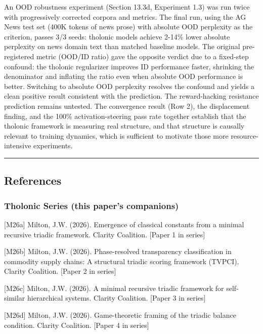 \documentclass[
  11pt,
  letterpaper,
]{article}
\begin{document}
An OOD robustness experiment (Section 13.3d, Experiment 1.3) was run
twice with progressively corrected corpora and metrics. The final run,
using the AG News test set (400K tokens of news prose) with absolute OOD
perplexity as the criterion, passes 3/3 seeds: tholonic models achieve
2-14\% lower absolute perplexity on news domain text than matched
baseline models. The original pre-registered metric (OOD/ID ratio) gave
the opposite verdict due to a fixed-step confound: the tholonic
regularizer improves ID performance faster, shrinking the denominator
and inflating the ratio even when absolute OOD performance is better.
Switching to absolute OOD perplexity resolves the confound and yields a
clean positive result consistent with the prediction. The reward-hacking
resistance prediction remains untested. The convergence result (Row 2),
the displacement finding, and the 100\% activation-steering pass rate
together establish that the tholonic framework is measuring real
structure, and that structure is causally relevant to training dynamics,
which is sufficient to motivate those more resource-intensive
experiments.

\begin{center}\rule{0.5\linewidth}{0.5pt}\end{center}

\subsection{References}\label{references}

\subsubsection{Tholonic Series (this paper's
companions)}\label{tholonic-series-this-papers-companions}

{[}M26a{]} Milton, J.W. (2026). Emergence of classical constants from a
minimal recursive triadic framework. Clarity Coalition. {[}Paper 1 in
series{]}

{[}M26b{]} Milton, J.W. (2026). Phase-resolved transparency
classification in commodity supply chains: A structural triadic scoring
framework (TVPCI). Clarity Coalition. {[}Paper 2 in series{]}

{[}M26c{]} Milton, J.W. (2026). A minimal recursive triadic framework
for self-similar hierarchical systems. Clarity Coalition. {[}Paper 3 in
series{]}

{[}M26d{]} Milton, J.W. (2026). Game-theoretic framing of the triadic
balance condition. Clarity Coalition. {[}Paper 4 in series{]}
\end{document}
